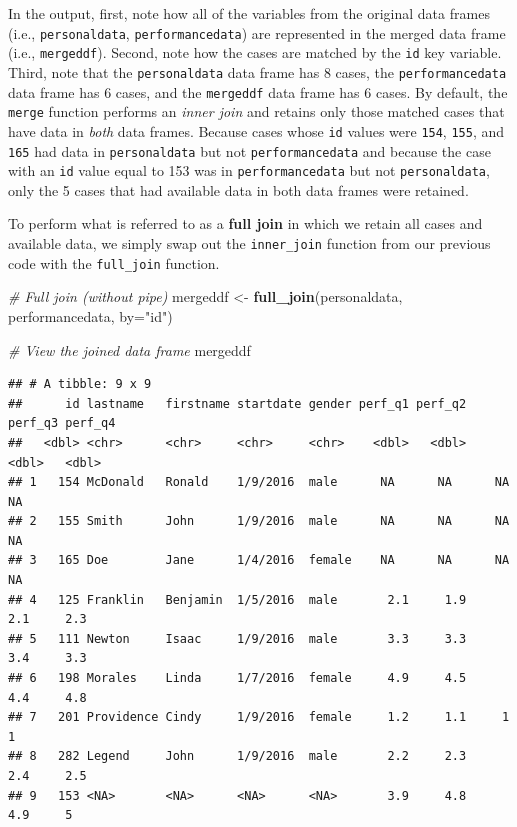 \documentclass[]{book}
\newenvironment{Shaded}{\begin{snugshade}}{\end{snugshade}}
\newcommand{\KeywordTok}[1]{\textcolor[rgb]{0.13,0.29,0.53}{\textbf{#1}}}
\newcommand{\DataTypeTok}[1]{\textcolor[rgb]{0.13,0.29,0.53}{#1}}
\newcommand{\StringTok}[1]{\textcolor[rgb]{0.31,0.60,0.02}{#1}}
\newcommand{\CommentTok}[1]{\textcolor[rgb]{0.56,0.35,0.01}{\textit{#1}}}
\newcommand{\NormalTok}[1]{#1}
\begin{document}
In the output, first, note how all of the variables from the original
data frames (i.e., \texttt{personaldata}, \texttt{performancedata}) are
represented in the merged data frame (i.e., \texttt{mergeddf}). Second,
note how the cases are matched by the \texttt{id} key variable. Third,
note that the \texttt{personaldata} data frame has 8 cases, the
\texttt{performancedata} data frame has 6 cases, and the
\texttt{mergeddf} data frame has 6 cases. By default, the \texttt{merge}
function performs an \emph{inner join} and retains only those matched
cases that have data in \emph{both} data frames. Because cases whose
\texttt{id} values were \texttt{154}, \texttt{155}, and \texttt{165} had
data in \texttt{personaldata} but not \texttt{performancedata} and
because the case with an \texttt{id} value equal to 153 was in
\texttt{performancedata} but not \texttt{personaldata}, only the 5 cases
that had available data in both data frames were retained.

To perform what is referred to as a \textbf{full join} in which we
retain all cases and available data, we simply swap out the
\texttt{inner\_join} function from our previous code with the
\texttt{full\_join} function.

\begin{Shaded}
\begin{Highlighting}[]
\CommentTok{# Full join (without pipe)}
\NormalTok{mergeddf <-}\StringTok{ }\KeywordTok{full_join}\NormalTok{(personaldata, performancedata, }\DataTypeTok{by=}\StringTok{"id"}\NormalTok{)}

\CommentTok{# View the joined data frame}
\NormalTok{mergeddf}
\end{Highlighting}
\end{Shaded}

\begin{verbatim}
## # A tibble: 9 x 9
##      id lastname   firstname startdate gender perf_q1 perf_q2 perf_q3 perf_q4
##   <dbl> <chr>      <chr>     <chr>     <chr>    <dbl>   <dbl>   <dbl>   <dbl>
## 1   154 McDonald   Ronald    1/9/2016  male      NA      NA      NA      NA  
## 2   155 Smith      John      1/9/2016  male      NA      NA      NA      NA  
## 3   165 Doe        Jane      1/4/2016  female    NA      NA      NA      NA  
## 4   125 Franklin   Benjamin  1/5/2016  male       2.1     1.9     2.1     2.3
## 5   111 Newton     Isaac     1/9/2016  male       3.3     3.3     3.4     3.3
## 6   198 Morales    Linda     1/7/2016  female     4.9     4.5     4.4     4.8
## 7   201 Providence Cindy     1/9/2016  female     1.2     1.1     1       1  
## 8   282 Legend     John      1/9/2016  male       2.2     2.3     2.4     2.5
## 9   153 <NA>       <NA>      <NA>      <NA>       3.9     4.8     4.9     5
\end{verbatim}
\end{document}
